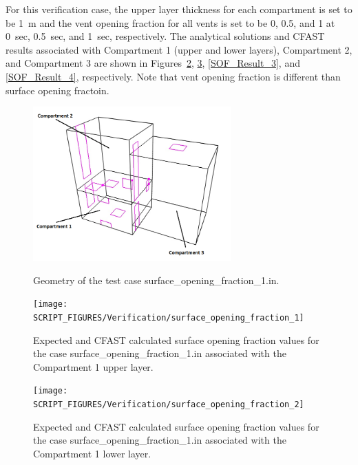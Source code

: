 For this verification case, the upper layer thickness for each compartment is set to be 1~m and the vent opening fraction for all vents is set to be 0, 0.5, and 1 at  0~sec, 0.5~sec, and 1~sec, respectively. The analytical solutions and CFAST results associated with Compartment 1 (upper and lower layers), Compartment 2, and Compartment 3 are shown in Figures~\ref{SOF_Result_1}, \ref{SOF_Result_2}, \ref{SOF_Result_3}, and \ref{SOF_Result_4}, respectively. Note that vent opening fraction is different than surface opening fractoin.

\begin{figure}[!ht]
\centering
\includegraphics[width=3.0in]{FIGURES/Verification/surface_opening_fraction_1} \\
\caption[Geometry of the test case {\ct surface\_opening\_fraction\_1.in}]{Geometry of the test case {\ct surface\_opening\_fraction\_1.in}.}
\label{SOF_GEO}
\end{figure}

\begin{figure}[!ht]
\centering
\texttt{[image: SCRIPT\_FIGURES/Verification/surface\_opening\_fraction\_1]}
\caption[Results of the test case {\ct surface\_opening\_fraction\_1.in}]{Expected and CFAST calculated surface opening fraction values for the case {\ct surface\_opening\_fraction\_1.in} associated with the Compartment 1 upper layer.}
\label{SOF_Result_1}
\end{figure}

\begin{figure}[!ht]
\centering
\texttt{[image: SCRIPT\_FIGURES/Verification/surface\_opening\_fraction\_2]}
\caption[Results of the test case {\ct surface\_opening\_fraction\_1.in}]{Expected and CFAST calculated surface opening fraction values for the case {\ct surface\_opening\_fraction\_1.in} associated with the Compartment 1 lower layer.}
\label{SOF_Result_2}
\end{figure}

